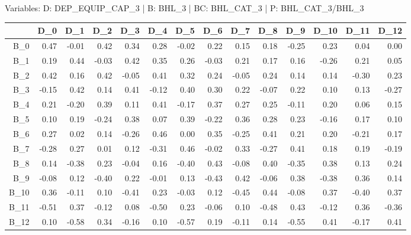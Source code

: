 \documentclass[10pt,a4paper]{article}\usepackage[]{graphicx}\usepackage[]{color}
\newcommand{\AaA}{\_}
\begin{document}
\newpage
Variables: D: DEP\AaA EQUIP\AaA CAP\AaA 3  | B: BHL\AaA 3  | BC: BHL\AaA CAT\AaA 3  | P: BHL\AaA CAT\AaA 3/BHL\AaA 3%
\begin{table}[ht]
\centering
\begin{tabular}{rrrrrrrrrrrrrr}
  \hline
 & D\_0 & D\_1 & D\_2 & D\_3 & D\_4 & D\_5 & D\_6 & D\_7 & D\_8 & D\_9 & D\_10 & D\_11 & D\_12 \\ 
  \hline
B\_0 & 0.47 & -0.01 & 0.42 & 0.34 & 0.28 & -0.02 & 0.22 & 0.15 & 0.18 & -0.25 & 0.23 & 0.04 & 0.00 \\ 
  B\_1 & 0.19 & 0.44 & -0.03 & 0.42 & 0.35 & 0.26 & -0.03 & 0.21 & 0.17 & 0.16 & -0.26 & 0.21 & 0.05 \\ 
  B\_2 & 0.42 & 0.16 & 0.42 & -0.05 & 0.41 & 0.32 & 0.24 & -0.05 & 0.24 & 0.14 & 0.14 & -0.30 & 0.23 \\ 
  B\_3 & -0.15 & 0.42 & 0.14 & 0.41 & -0.12 & 0.40 & 0.30 & 0.22 & -0.07 & 0.22 & 0.10 & 0.13 & -0.27 \\ 
  B\_4 & 0.21 & -0.20 & 0.39 & 0.11 & 0.41 & -0.17 & 0.37 & 0.27 & 0.25 & -0.11 & 0.20 & 0.06 & 0.15 \\ 
  B\_5 & 0.10 & 0.19 & -0.24 & 0.38 & 0.07 & 0.39 & -0.22 & 0.36 & 0.28 & 0.23 & -0.16 & 0.17 & 0.10 \\ 
  B\_6 & 0.27 & 0.02 & 0.14 & -0.26 & 0.46 & 0.00 & 0.35 & -0.25 & 0.41 & 0.21 & 0.20 & -0.21 & 0.17 \\ 
  B\_7 & -0.28 & 0.27 & 0.01 & 0.12 & -0.31 & 0.46 & -0.02 & 0.33 & -0.27 & 0.41 & 0.18 & 0.19 & -0.19 \\ 
  B\_8 & 0.14 & -0.38 & 0.23 & -0.04 & 0.16 & -0.40 & 0.43 & -0.08 & 0.40 & -0.35 & 0.38 & 0.13 & 0.24 \\ 
  B\_9 & -0.08 & 0.12 & -0.40 & 0.22 & -0.01 & 0.13 & -0.43 & 0.42 & -0.06 & 0.38 & -0.38 & 0.36 & 0.14 \\ 
  B\_10 & 0.36 & -0.11 & 0.10 & -0.41 & 0.23 & -0.03 & 0.12 & -0.45 & 0.44 & -0.08 & 0.37 & -0.40 & 0.37 \\ 
  B\_11 & -0.51 & 0.37 & -0.12 & 0.08 & -0.50 & 0.23 & -0.06 & 0.10 & -0.48 & 0.43 & -0.12 & 0.36 & -0.36 \\ 
  B\_12 & 0.10 & -0.58 & 0.34 & -0.16 & 0.10 & -0.57 & 0.19 & -0.11 & 0.14 & -0.55 & 0.41 & -0.17 & 0.41 \\ 
   \hline
\end{tabular}
\end{table}
\end{document}
